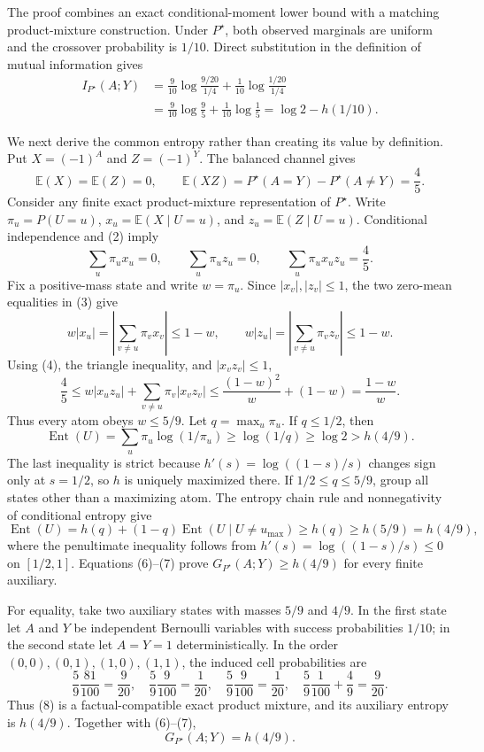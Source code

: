 The proof combines an exact conditional-moment lower bound with a matching product-mixture construction. Under \(P^\star\), both observed marginals are uniform and the crossover probability is \(1/10\). Direct substitution in the definition of mutual information gives
\[
\begin{aligned}
I_{P^\star}(A;Y)
&=\frac9{10}\log\frac{9/20}{1/4}
  +\frac1{10}\log\frac{1/20}{1/4}\\
&=\frac9{10}\log\frac95+\frac1{10}\log\frac15
=\log2-h(1/10).
\end{aligned}
\tag{1}
\]

We next derive the common entropy rather than creating its value by definition. Put \(X=(-1)^A\) and \(Z=(-1)^Y\). The balanced channel gives
\[
\mathbb E(X)=\mathbb E(Z)=0,
\qquad
\mathbb E(XZ)=P^\star(A=Y)-P^\star(A\neq Y)=\frac45.
\tag{2}
\]
Consider any finite exact product-mixture representation of \(P^\star\). Write \(\pi_u=P(U=u)\), \(x_u=\mathbb E(X\mid U=u)\), and \(z_u=\mathbb E(Z\mid U=u)\). Conditional independence and (2) imply
\[
\sum_u\pi_u x_u=0,
\qquad
\sum_u\pi_u z_u=0,
\qquad
\sum_u\pi_u x_uz_u=\frac45.
\tag{3}
\]
Fix a positive-mass state and write \(w=\pi_u\). Since \(|x_v|,|z_v|\leq1\), the two zero-mean equalities in (3) give
\[
w|x_u|
=\left|\sum_{v\neq u}\pi_vx_v\right|\leq1-w,
\qquad
w|z_u|
=\left|\sum_{v\neq u}\pi_vz_v\right|\leq1-w.
\tag{4}
\]
Using (4), the triangle inequality, and \(|x_vz_v|\leq1\),
\[
\frac45
\leq w|x_uz_u|+\sum_{v\neq u}\pi_v|x_vz_v|
\leq\frac{(1-w)^2}{w}+(1-w)
=\frac{1-w}{w}.
\tag{5}
\]
Thus every atom obeys \(w\leq5/9\). Let \(q=\max_u\pi_u\). If \(q\leq1/2\), then
\[
\operatorname{Ent}(U)
=\sum_u\pi_u\log(1/\pi_u)
\geq\log(1/q)\geq\log2>h(4/9).
\tag{6}
\]
The last inequality is strict because \(h'(s)=\log((1-s)/s)\) changes sign only at \(s=1/2\), so \(h\) is uniquely maximized there.
If \(1/2\leq q\leq5/9\), group all states other than a maximizing atom. The entropy chain rule and nonnegativity of conditional entropy give
\[
\operatorname{Ent}(U)
=h(q)+(1-q)\operatorname{Ent}(U\mid U\neq u_{\max})
\geq h(q)\geq h(5/9)=h(4/9),
\tag{7}
\]
where the penultimate inequality follows from \(h'(s)=\log((1-s)/s)\leq0\) on \([1/2,1]\). Equations (6)--(7) prove \(G_{P^\star}(A;Y)\geq h(4/9)\) for every finite auxiliary.

For equality, take two auxiliary states with masses \(5/9\) and \(4/9\). In the first state let \(A\) and \(Y\) be independent Bernoulli variables with success probabilities \(1/10\); in the second state let \(A=Y=1\) deterministically. In the order \((0,0),(0,1),(1,0),(1,1)\), the induced cell probabilities are
\[
\frac59\frac{81}{100}=\frac9{20},
\quad
\frac59\frac9{100}=\frac1{20},
\quad
\frac59\frac9{100}=\frac1{20},
\quad
\frac59\frac1{100}+\frac49=\frac9{20}.
\tag{8}
\]
Thus (8) is a factual-compatible exact product mixture, and its auxiliary entropy is \(h(4/9)\). Together with (6)--(7),
\[
G_{P^\star}(A;Y)=h(4/9).
\tag{9}
\]


